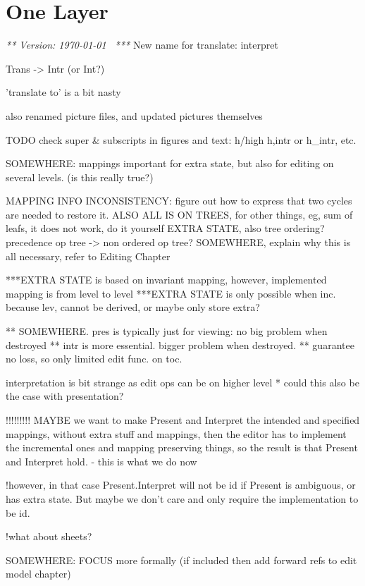 \chapter{One Layer}
\label{chap:singleLayer}

{\em *** Version: \today~ ***}
\bc
New name for translate:
interpret

Trans -> Intr  (or Int?)


'translate to' is a bit nasty

also renamed picture files, and updated pictures themselves


TODO
check super & subscripts in figures and text: h/high h,intr or h_intr, etc.

SOMEWHERE: mappings important for extra state, but also for editing on several levels. (is this really true?)

MAPPING INFO INCONSISTENCY: figure out how to express that two cycles are needed to restore it.
ALSO ALL IS ON TREES, for other things, eg, sum of leafs, it does not work, do it yourself
EXTRA STATE, also tree ordering? precedence op tree -> non ordered op tree?
SOMEWHERE, explain why this is all necessary, refer to Editing Chapter


***EXTRA STATE is based on invariant mapping, however, implemented mapping is from level to level
***EXTRA STATE is only possible when inc. because lev, cannot be derived, or maybe only store extra?

** SOMEWHERE. pres is typically just for viewing: no big problem when destroyed
** intr is more essential. bigger problem when destroyed.
** guarantee no loss, so only limited edit func. on toc.

interpretation is bit strange as edit ops can be on higher level
* could this also be the case with presentation?


!!!!!!!!!
MAYBE we want to make Present and Interpret the intended and specified mappings, 
without extra stuff and mappings, then the editor has to implement the incremental ones
 and mapping preserving things, so the result is that Present and Interpret hold.
- this is what we do now

!however, in that case Present.Interpret will not be id if Present is ambiguous, or 
has extra state. But maybe we don't care and only require the implementation to be id.

!what about sheets? 

SOMEWHERE: FOCUS more formally (if included then add forward refs to edit model chapter)


